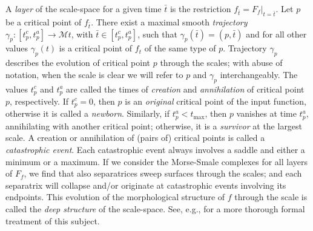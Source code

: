A \emph{layer} of the scale-space for a given time $\bar{t}$ is the restriction $f_{\bar t}=F_f|_{t=\bar{t}}$.
Let $p$ be a critical point of $f_{\bar t}$.
There exist a maximal smooth \emph{trajectory} $\gamma_p  : [t^c_p,t^a_p] \longrightarrow {\mathcal M}t$, with $\bar{t}\in[t^c_p,t^a_p]$, such that $\gamma_p(\bar{t})=(p,\bar{t})$ and for all other values $\gamma_p(t)$ is a critical point of $f_t$ of the same type of $p$.
Trajectory $\gamma_p$ describes the evolution of critical point $p$ through the scales; with abuse of notation, when the scale is clear we will refer to $p$ and $\gamma_p$ interchangeably. 
The values $t^c_p$ and $t^a_p$ are called the times of \emph{creation} and \emph{annihilation} of critical point $p$, respectively.
If $t^c_p=0$, then $p$ is an \emph{original} critical point of the input function, otherwise it is called a \emph{newborn}. 
Similarly, if $t^a_p<t_{\max}$, then $p$ vanishes at time $t^a_p$, annihilating with another critical point; otherwise, it is a \emph{survivor} at the largest scale.
A creation or annihilation of (pairs of) critical points is called a \emph{catastrophic event}.
Each catastrophic event always involves a saddle and either a minimum or a maximum.
%
If we consider the Morse-Smale complexes for all layers of $F_f$, we find that also separatrices sweep surfaces through the scales;
and each separatrix will collapse and/or originate at catastrophic events involving its endpoints. 
This evolution of the morphological structure of $f$ through the scale is called the \emph{deep structure} of the scale-space.
See, e.g., \cite{Florack:2000wg} for a more thorough formal treatment of this subject. 



